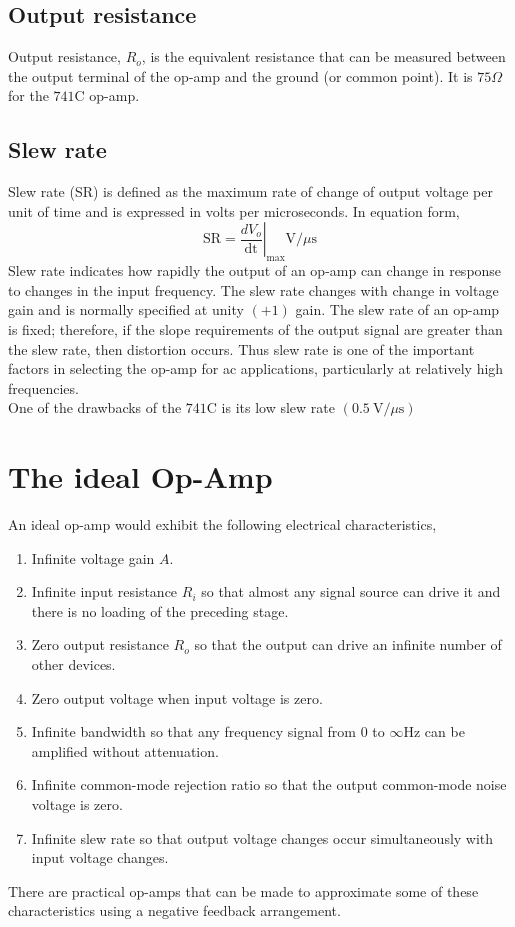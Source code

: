    \subsection{Output resistance}
   Output resistance, $R_{o}$, is the equivalent resistance that can be measured between the output terminal of the op-amp and the ground (or common point). It is $75 \Omega$ for the $741 \mathrm{C}$ op-amp.
   \subsection{Slew rate}
   Slew rate (SR) is defined as the maximum rate of change of output voltage per unit of time and is expressed in volts per microseconds. In equation form,
   $$
   \mathrm{SR}=\left.\frac{d V_{o}}{\mathrm{dt}}\right|_\mathrm{max} \mathrm{V} / \mu \mathrm{s}
   $$
   Slew rate indicates how rapidly the output of an op-amp can change in response to changes in the input frequency. The slew rate changes with change in voltage gain and is normally specified at unity $(+1)$ gain. The slew rate of an op-amp is fixed; therefore, if the slope requirements of the output signal are greater than the slew rate, then distortion occurs. Thus slew rate is one of the important factors in selecting the op-amp for ac applications, particularly at relatively high frequencies.\\
    One of the drawbacks of the $ 741 \mathrm{C}$ is its low slew rate $(0.5 \mathrm{~V} / \mu \mathrm{s})$ 
   \section{The ideal Op-Amp} 
   An ideal op-amp would exhibit the following electrical characteristics,
   \begin{enumerate}
   	\item  Infinite voltage gain $A$.
   	\item Infinite input resistance $R_{i}$ so that almost any signal source can drive it and there is no loading of the preceding stage.
   	\item Zero output resistance $R_{o}$ so that the output can drive an infinite number of other devices.
   	\item Zero output voltage when input voltage is zero.
   	\item Infinite bandwidth so that any frequency signal from 0 to $\infty \mathrm{Hz}$ can be amplified without attenuation.
   	\item Infinite common-mode rejection ratio so that the output common-mode noise voltage is zero.
   	\item Infinite slew rate so that output voltage changes occur simultaneously with input voltage changes.
   \end{enumerate}
   There are practical op-amps that can be made to approximate some of these characteristics using a negative feedback arrangement.

